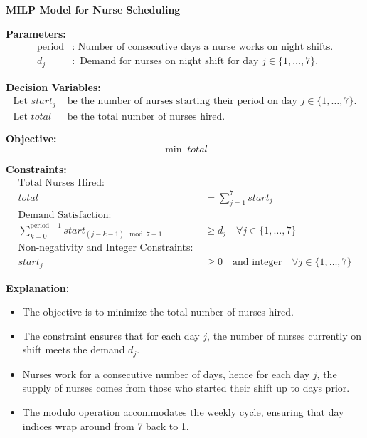\documentclass{article}
\begin{document}
\textbf{MILP Model for Nurse Scheduling}

\textbf{Parameters:}
\begin{align*}
\text{period} & : \text{ Number of consecutive days a nurse works on night shifts.} \\
d_j & : \text{ Demand for nurses on night shift for day } j \in \{1, \ldots, 7\}.
\end{align*}

\textbf{Decision Variables:}
\begin{align*}
\text{Let } start_j & \text{ be the number of nurses starting their period on day } j \in \{1, \ldots, 7\}. \\
\text{Let } total & \text{ be the total number of nurses hired.}
\end{align*}

\textbf{Objective:}
\[
\min \; total
\]

\textbf{Constraints:}
\begin{align*}
\text{Total Nurses Hired: } \\
total & = \sum_{j=1}^{7} start_j \\

\text{Demand Satisfaction: } \\
\sum_{k=0}^{\text{period}-1} start_{(j-k-1) \mod 7 + 1} & \geq d_j \quad \forall j \in \{1, \ldots, 7\} \\

\text{Non-negativity and Integer Constraints: } \\
start_j & \geq 0 \quad \text{and integer} \quad \forall j \in \{1, \ldots, 7\}
\end{align*}

\textbf{Explanation:}
\begin{itemize}
    \item The objective is to minimize the total number of nurses hired.
    \item The constraint ensures that for each day \( j \), the number of nurses currently on shift meets the demand \( d_j \). 
    \item Nurses work for a consecutive number of  days, hence for each day \( j \), the supply of nurses comes from those who started their shift up to  days prior.
    \item The modulo operation accommodates the weekly cycle, ensuring that day indices wrap around from 7 back to 1.
\end{itemize}
\end{document}
